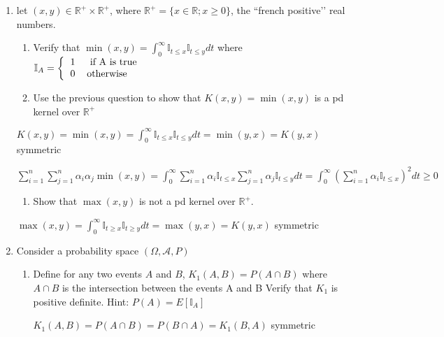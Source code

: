\documentclass[11pt]{article}
\begin{document}
\begin{enumerate}
\item let $(x,y) \in \mathbb{R}^+ \times \mathbb{R}^+$, where $\mathbb{R}^+=\{x \in \mathbb{R};x \geq 0\}$, the ``french positive\rq\rq{} real numbers. 

\begin{enumerate}
\item  Verify that $\min(x,y) = \int_0^\infty \mathbb{I}_{t\leq x} \mathbb{I}_{t\leq y} dt$
where  $\mathbb{I}_A =  \left\{
\begin{tabular}{ll}
1 & \mbox{ if A is true}\\
0 & \mbox{otherwise}
\end{tabular}\right.$

\item Use the previous question to show that $K(x,y)=\min(x,y)$ is a pd kernel over $\mathbb{R}^+$
\end{enumerate}

\vspace{5mm}
$K(x,y)=\min(x,y)=\int_0^\infty \mathbb{I}_{t\leq x} \mathbb{I}_{t\leq y} dt=\min(y,x)=K(y,x)$ symmetric

$\sum_{i=1}^n\sum_{j=1}^n\alpha_i\alpha_j\min(x,y)=\int_0^\infty \sum_{i=1}^n\alpha_i\mathbb{I}_{t\leq x} \sum_{j=1}^n\alpha_j\mathbb{I}_{t\leq y} dt=\int_0^\infty (\sum_{i=1}^n\alpha_i\mathbb{I}_{t\leq x})^2dt\ge0$
\vspace{5mm}

\begin{enumerate}
\item Show that $\max(x,y)$ is not a pd kernel over  $\mathbb{R}^+$. 
\end{enumerate}

\vspace{5mm}
$\max(x,y)=\int_0^\infty \mathbb{I}_{t\geq x} \mathbb{I}_{t\geq y} dt=\max(y,x)=K(y,x)$ symmetric


\vspace{5mm}

\item Consider a probability space $(\Omega,\mathcal{A},P)$



\begin{enumerate}
\item Define for any two events $A$ and $B$, $K_1(A,B)=P(A \cap B)$
where $A \cap B$ is the intersection between the events A and B 
Verify that $K_1$ is positive definite. Hint: $P(A)=E[\mathbb{I}_A]$

\vspace{5mm}
$K_1(A,B)=P(A \cap B)=P(B \cap A)=K_1(B,A)$ symmetric


\end{enumerate}
\end{enumerate}
\end{document}
